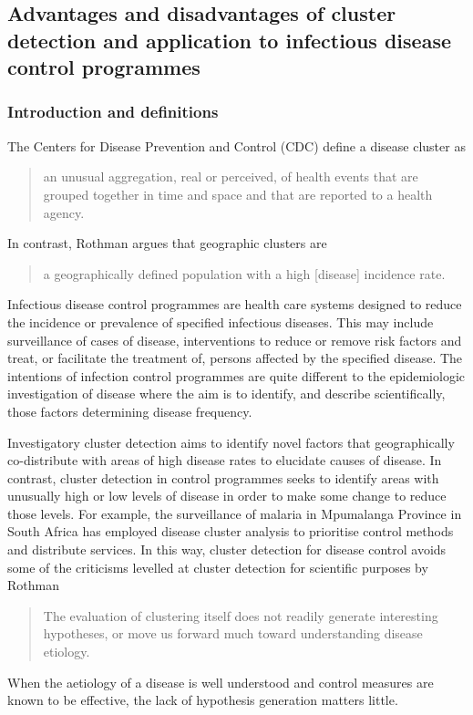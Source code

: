 \documentclass[11pt,a4paper,twoside]{article}\usepackage[]{graphicx}\usepackage[]{color}
\begin{document}

\subsection{Advantages and disadvantages of cluster detection and application to infectious disease control programmes}
\subsubsection{Introduction and definitions}
The Centers for Disease Prevention and Control (CDC) define a disease cluster as 
\begin{quotation}
 an unusual aggregation, real or perceived, of health events that are grouped together in time and space and that are reported to a health agency.\cite{cdc1990}
\end{quotation}
In contrast, Rothman argues that geographic clusters are 
\begin{quotation}
 a geographically defined population with a high [disease] incidence rate.\cite{Rothman1990}
\end{quotation}

Infectious disease control programmes are health care systems designed to reduce the incidence or prevalence of specified infectious diseases. 
This may include surveillance of cases of disease, interventions to reduce or remove risk factors and treat, or facilitate the treatment of, persons affected by the specified disease. 
The intentions of infection control programmes are quite different to the epidemiologic investigation of disease where the aim is to identify, and describe scientifically, those factors determining disease frequency. 

Investigatory cluster detection aims to identify novel factors that geographically co-distribute with areas of high disease rates to elucidate causes of disease.
In contrast, cluster detection in control programmes seeks to identify areas with unusually high or low levels of disease in order to make some change to reduce those levels. 
For example, the surveillance of malaria in Mpumalanga Province in South Africa has employed disease cluster analysis to prioritise control methods and distribute services. \cite{Coleman2009}
In this way, cluster detection for disease control avoids some of the criticisms levelled at cluster detection for scientific purposes by Rothman
\begin{quotation}
 The evaluation of clustering itself does not readily generate interesting hypotheses, or move us forward much toward understanding disease etiology. 
\end{quotation}
When the aetiology of a disease is well understood and control measures are known to be effective, the lack of hypothesis generation matters little. 
\end{document}
